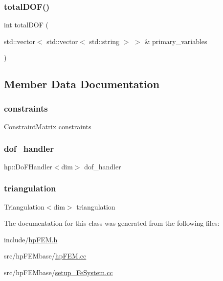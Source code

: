 \mbox{\label{classhp_f_e_m_a9ceee3881af75e3be863fdb2d1688c0e}} 
\subsubsection{\texorpdfstring{total\+D\+O\+F()}{totalDOF()}}
{\footnotesize\ttfamily int total\+D\+OF (\begin{DoxyParamCaption}\item[{std\+::vector$<$ std\+::vector$<$ std\+::string $>$ $>$ \&}]{primary\+\_\+variables }\end{DoxyParamCaption})}



\subsection{Member Data Documentation}
\mbox{\label{classhp_f_e_m_aa08dcec4445eed1687b99cdb7b24b785}} 
\subsubsection{\texorpdfstring{constraints}{constraints}}
{\footnotesize\ttfamily Constraint\+Matrix constraints}

\mbox{\label{classhp_f_e_m_ab4df20fb431f370878adc06e19280d62}} 
\subsubsection{\texorpdfstring{dof\+\_\+handler}{dof\_handler}}
{\footnotesize\ttfamily hp\+::\+Do\+F\+Handler$<$dim$>$ dof\+\_\+handler}

\mbox{\label{classhp_f_e_m_a1e604d1e68926caf1ebc67d2a7451783}} 
\subsubsection{\texorpdfstring{triangulation}{triangulation}}
{\footnotesize\ttfamily Triangulation$<$dim$>$ triangulation}



The documentation for this class was generated from the following files\+:\begin{DoxyCompactItemize}
\item 
include/\mbox{\hyperlink{hp_f_e_m_8h}{hp\+F\+E\+M.\+h}}\item 
src/hp\+F\+E\+Mbase/\mbox{\hyperlink{hp_f_e_m_8cc}{hp\+F\+E\+M.\+cc}}\item 
src/hp\+F\+E\+Mbase/\mbox{\hyperlink{setup___fe_system_8cc}{setup\+\_\+\+Fe\+System.\+cc}}\end{DoxyCompactItemize}
